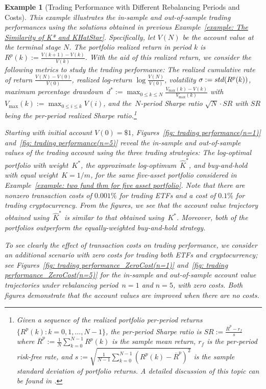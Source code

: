 \documentclass[10pt]{article} %
\newtheorem{example}{Example}[section]
\begin{document}
	
	\medskip
	\begin{example} [Trading Performance with Different Rebalancing Periods and Costs] \rm \label{example: Trading Performance with Different Rebalancing Periods}
		This example illustrates the in-sample and out-of-sample trading performances using the solutions obtained in previous Example~\ref{example: The Similarity of K* and KHatStar}.
		Specifically, let $V(N)$ be the account value at the terminal stage $N$.
		The \textit{portfolio realized return} in period $k$ is~$R^p(k) := \frac{V(k+1) - V(k)}{V(k)}$.
		With the aid of this realized return, we consider the following metrics to study the trading performance:  The realized \textit{cumulative rate of return} $\frac{V(N)-V(0)}{V(0)}$, \textit{realized log-return} $\log \frac{V(N)}{V(0)}$,  \textit{volatility} $\sigma:= {\rm std}(R^p(k))$, \textit{maximum percentage drawdown}~$d^*:= \max_{0\leq k \leq N} \frac{V_{\max}(k) - V(k)}{V_{\max}(k)}$ with $V_{\max}(k):= \max_{0 \leq i \leq k} V(i)$, and the~\textit{$N$-period Sharpe ratio} $\sqrt{N} \cdot SR$ with $SR$ being the \textit{per-period realized Sharpe ratio}.\footnote{Given a  sequence of the realized  portfolio per-period returns $\{R^p(k): k=0,1,\dots,N-1\}$, the per-period Sharpe ratio is $SR:= \frac{\overline{R}^p - r_f}{s}$ where $\overline{R}^p:=\frac{1}{N} \sum_{k=0}^{N-1} R^p(k)$ is the sample mean return, $r_f$ is the per-period risk-free rate, and $s:= \sqrt{ \frac{1}{N-1} \sum_{k=0}^{N-1} (R^p(k) - \overline{R}^p)^2}$ is the sample standard deviation of portfolio returns. A detailed discussion of this topic can be found in \cite{lo2002statistics}.}
		
		Starting with initial account $V(0)= \$1$, Figures~\ref{fig: trading performance(n=1)} and~\ref{fig: trading performance(n=5)} reveal the in-sample and out-of-sample values of the trading account using the three trading strategies: The log-optimal portfolio with weight~$K^*$, the approximate log-optimum~$\widehat{K}^*$, and buy-and-hold with equal weight~$K=1/m$, for the same five-asset portfolio considered in Example~\ref{example: two fund thm for five asset portfolio}. 
		Note that there are nonzero transaction costs of $0.001\%$ for trading ETFs and a cost of $0.1\%$ for trading cryptocurrency. 
		From the figures, we see that the account value trajectory obtained using~$\widehat{K}^*$ is similar to that obtained using~$K^*$.
		Moreover, both of the portfolios outperform the equally-weighted buy-and-hold strategy. 
		
		To see clearly the effect of transaction costs on trading performance, we consider an additional scenario with zero costs for trading both ETFs and cryptocurrency; see Figures~\ref{fig: trading performance_ZeroCost(n=1)} and~\ref{fig: trading performance_ZeroCost(n=5)} for the  in-sample and out-of-sample account value trajectories under rebalancing period~$n=1$ and $n=5$, with zero costs. 
		Both figures demonstrate that the account values are improved when there are no costs. 
		

\end{example}
\end{document}
